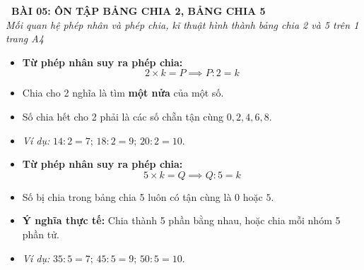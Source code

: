 \documentclass[12pt,a4paper]{article}
\begin{document}
\begin{tcolorbox}[
  enhanced,
  colback=teal!8!white,
  colframe=teal!70!black,
  arc=3mm, boxrule=1.2pt,
  left=3mm, right=3mm, top=2mm, bottom=2mm,
  halign=center
]
  {\LARGE\bfseries\color{teal!90!black}\faBookmark\ BÀI 05: ÔN TẬP BẢNG CHIA 2, BẢNG CHIA 5}\\[1mm]
  {\itshape\footnotesize\color{black!75} Mối quan hệ phép nhân và phép chia, kĩ thuật hình thành bảng chia 2 và 5 trên 1 trang A4}
\end{tcolorbox}

\vspace{-2mm}

\noindent
\begin{minipage}[t]{0.49\textwidth}\vspace{0pt}
\begin{tcolorbox}[
  enhanced,
  colback=blue!4!white,
  colframe=blue!75!black,
  arc=2mm, boxrule=0.8pt,
  left=2mm, right=2mm, top=1.8mm, bottom=1.8mm,
  title={\footnotesize\bfseries\color{white}\faShareAlt\ 1. Bảng chia 2 (Chia đều cho 2)}
]
{\footnotesize
\begin{itemize}\setlength{\itemsep}{1pt}\setlength{\leftskip}{-2.5mm}
  \item \textbf{Từ phép nhân suy ra phép chia:}
  $$2 \times k = P \implies P : 2 = k$$
  \item Chia cho 2 nghĩa là tìm \textbf{một nửa} của một số.
  \item Số chia hết cho 2 phải là các số chẵn tận cùng $0, 2, 4, 6, 8$.
  \item \textit{Ví dụ:} $14 : 2 = 7$; $18 : 2 = 9$; $20 : 2 = 10$.
\end{itemize}
}
\end{tcolorbox}
\end{minipage}
\hfill
\begin{minipage}[t]{0.49\textwidth}\vspace{0pt}
\begin{tcolorbox}[
  enhanced,
  colback=teal!4!white,
  colframe=teal!75!black,
  arc=2mm, boxrule=0.8pt,
  left=2mm, right=2mm, top=1.8mm, bottom=1.8mm,
  title={\footnotesize\bfseries\color{white}\faShareAlt\ 2. Bảng chia 5 (Chia đều cho 5)}
]
{\footnotesize
\begin{itemize}\setlength{\itemsep}{1pt}\setlength{\leftskip}{-2.5mm}
  \item \textbf{Từ phép nhân suy ra phép chia:}
  $$5 \times k = Q \implies Q : 5 = k$$
  \item Số bị chia trong bảng chia 5 luôn có tận cùng là $0$ hoặc $5$.
  \item \textbf{Ý nghĩa thực tế:} Chia thành 5 phần bằng nhau, hoặc chia mỗi nhóm 5 phần tử.
  \item \textit{Ví dụ:} $35 : 5 = 7$; $45 : 5 = 9$; $50 : 5 = 10$.
\end{itemize}
}
\end{tcolorbox}
\end{minipage}
\end{document}
